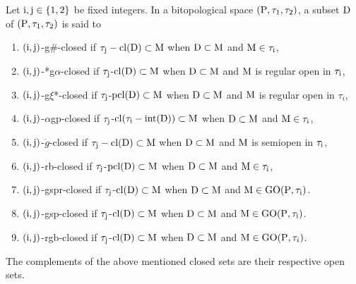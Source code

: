 \begin{dfn}\label{dfn1.6.1}
Let $\mathrm{i}, \mathrm{j}\in \{1, 2\}$ be fixed integers. In a bitopological space $(\mathrm{P}, \tau_1, \tau_2)$, a subset $\mathrm{D}$ of $(\mathrm{P}, \tau_1, \tau_2)$ is said to
\begin{enumerate}[\rm (i)]
\item $(\mathrm{i}, \mathrm{j})$-g\#-closed \cite{Veerakumar} if $\tau_{\mathrm{j}}- \mathrm{cl}(\mathrm{D})\subset \mathrm{M}$ when $\mathrm{D}\subset\mathrm{M}$ and $\mathrm{M}\in \tau_{\mathrm{i}}$,
\item $(\mathrm{i}, \mathrm{j})$-*g$\alpha$-closed \cite{Vigneshwaran} if $\tau_{\mathrm{j}}$-$\mathrm{cl}(\mathrm{D})\subset\mathrm{M}$ when $\mathrm{D}\subset\mathrm{M}$ and $\mathrm{M}$ is regular open in $\tau_{\mathrm{i}}$,
\item $(\mathrm{i}, \mathrm{j})$-g$\xi$*-closed \cite{VivekPrabu} if $\tau_{\mathrm{j}}$-$\mbox{pcl}(\mathrm{D}) \subset\mathrm{M}$ when $\mathrm{D}\subset\mathrm{M}$ and $\mathrm{M}$ is regular open in $\tau_i$,
\item $(\mathrm{i}, \mathrm{j})$-$\alpha$gp-closed \cite{Navalagi2} if $\tau_{\mathrm{j}}$-$\mathrm{cl}(\tau_{\mathrm{i}}-\mbox{int}(\mathrm{D}))\subset\mathrm{M}$ when $\mathrm{D}\subset\mathrm{M}$ and $\mathrm{M}\in\tau_{\mathrm{i}}$,
\item $(\mathrm{i}, \mathrm{j})$-$\ddot{g}$-closed \cite{key} if $\tau_{\mathrm{j}}-\mathrm{cl}(\mathrm{D}) \subset \mathrm{M}$ when $\mathrm{D}\subset\mathrm{M}$ and $\mathrm{M}$ is semiopen in $\tau_{\mathrm{i}}$,
\item $(\mathrm{i}, \mathrm{j})$-rb-closed \cite{Nagaveni2} if $\tau_{\mathrm{j}}$-$\mbox{pcl}(\mathrm{D}) \subset\mathrm{M}$ when $\mathrm{D}\subset\mathrm{M}$ and $\mathrm{M}\in\tau_{\mathrm{i}}$,
\item $(\mathrm{i}, \mathrm{j})$-gspr-closed \cite{Navalagi} if $\tau_{\mathrm{j}}$-$\mathrm{cl}(\mathrm{D}) \subset \mathrm{M}$ when $\mathrm{D} \subset \mathrm{M}$ and $\mathrm{M}\in\mbox{GO}(\mathrm{P}, \tau_{\mathrm{i}})$.
\item $(\mathrm{i}, \mathrm{j})$-gsp-closed \cite{Dontchev} if $\tau_{\mathrm{j}}$-$\mathrm{cl}(\mathrm{D}) \subset \mathrm{M}$ when $\mathrm{D} \subset \mathrm{M}$ and $\mathrm{M}\in \mbox{GO}(\mathrm{P}, \tau_{\mathrm{i}})$.
\item $(\mathrm{i}, \mathrm{j})$-rgb-closed \cite{Mariappa} if $\tau_{\mathrm{j}}$-$\mathrm{cl}(\mathrm{D}) \subset \mathrm{M}$ when $\mathrm{D} \subset \mathrm{M}$ and $\mathrm{M}\in \mbox{GO}(\mathrm{P}, \tau_i)$.
\end{enumerate}
\end{dfn}

The complements of the above mentioned closed sets are their respective open sets. 

